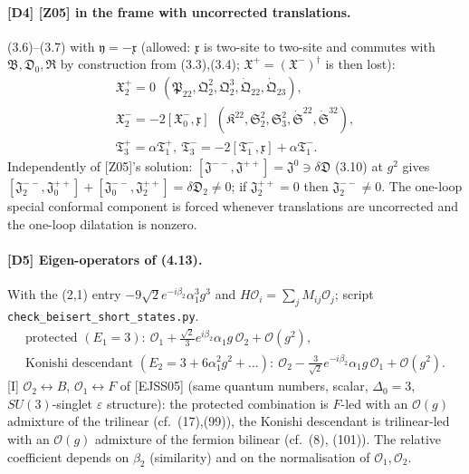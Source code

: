 \documentclass[10pt]{article}
\begin{document}
\paragraph{[D4] [Z05] in the frame with uncorrected translations.} (3.6)--(3.7) with $\mathfrak y=-\mathfrak x$ (allowed: $\mathfrak x$ is two-site to two-site and commutes with $\mathfrak B,\mathfrak D_0,\mathfrak R$ by construction from (3.3),(3.4); $\mathfrak X^+=(\mathfrak X^-)^\dagger$ is then lost):
\begin{gather*}
\mathfrak X^+_2=0\ \ (\mathfrak P_{22},\mathfrak Q^2_2,\mathfrak Q^3_2,\dot{\mathfrak Q}_{22},\dot{\mathfrak Q}_{23}),\\ \mathfrak X^-_2=-2[\mathfrak X^-_0,\mathfrak x]\ \ (\mathfrak K^{22},\mathfrak S^2_2,\mathfrak S^2_3,\dot{\mathfrak S}^{22},\dot{\mathfrak S}^{32}),\\ \mathfrak T^+_3=\alpha\mathfrak T^+_1,\ \mathfrak T^-_3=-2[\mathfrak T^-_1,\mathfrak x]+\alpha\mathfrak T^-_1.
\end{gather*}
Independently of [Z05]'s solution: $[\mathfrak J^{--},\mathfrak J^{++}]=\mathfrak J^0\ni\delta\mathfrak D$ (3.10) at $g^2$ gives $[\mathfrak J^{--}_2,\mathfrak J^{++}_0]+[\mathfrak J^{--}_0,\mathfrak J^{++}_2]=\delta\mathfrak D_2\neq0$; if $\mathfrak J^{++}_2=0$ then $\mathfrak J^{--}_2\neq0$. The one-loop special conformal component is forced whenever translations are uncorrected and the one-loop dilatation is nonzero.

\paragraph{[D5] Eigen-operators of (4.13).} With the (2,1) entry $-9\sqrt2e^{-i\beta_2}\alpha_1^3g^3$ and $H\mathcal O_i=\sum_jM_{ij}\mathcal O_j$; script \texttt{check\_beisert\_\allowbreak short\_states.py}.
\begin{gather*}
\text{protected }(E_1=3):\ \mathcal O_1+\tfrac{\sqrt2}{3}e^{i\beta_2}\alpha_1g\,\mathcal O_2+\mathcal O(g^2),\\ \text{Konishi descendant }(E_2=3+6\alpha_1^2g^2+\dots):\ \mathcal O_2-\tfrac{3}{\sqrt2}e^{-i\beta_2}\alpha_1g\,\mathcal O_1+\mathcal O(g^2).
\end{gather*}
[I] $\mathcal O_2\leftrightarrow B$, $\mathcal O_1\leftrightarrow F$ of [EJSS05] (same quantum numbers, scalar, $\Delta_0=3$, $SU(3)$-singlet $\varepsilon$ structure): the protected combination is $F$-led with an $\mathcal O(g)$ admixture of the trilinear (cf.\ (17),(99)), the Konishi descendant is trilinear-led with an $\mathcal O(g)$ admixture of the fermion bilinear (cf.\ (8), (101)). The relative coefficient depends on $\beta_2$ (similarity) and on the normalisation of $\mathcal O_1,\mathcal O_2$.
\end{document}
